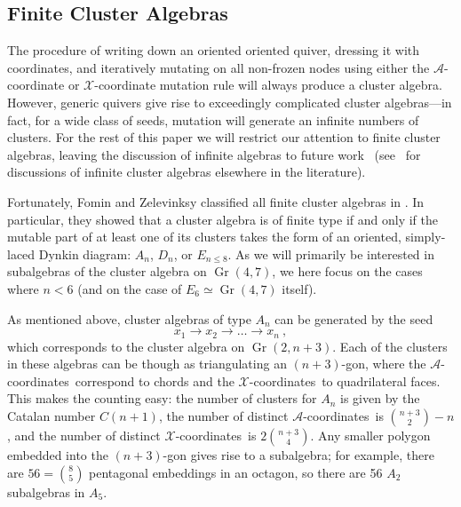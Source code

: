 \documentclass[11pt]{article}
\DeclareMathOperator{\Gr}{Gr}
\def\x{\mathcal{X}}
\def\xcoords{$\mathcal{X}$-coordinates}
\def\a{\mathcal{A}}
\def\acoords{$\mathcal{A}$-coordinates}
\begin{document}


\subsection{Finite Cluster Algebras}\label{sec:finite-algebras}

The procedure of writing down an oriented oriented quiver, dressing it with coordinates, and iteratively mutating on all non-frozen nodes using either the $\a$-coordinate or $\x$-coordinate mutation rule will always produce a cluster algebra. However, generic quivers give rise to exceedingly complicated cluster algebras---in fact, for a wide class of seeds, mutation will generate an infinite numbers of clusters. For the rest of this paper we will restrict our attention to finite cluster algebras, leaving the discussion of infinite algebras to future work~\cite{cluster_subalgebras_ii} (see~\cite{} for discussions of infinite cluster algebras elsewhere in the literature). 


Fortunately, Fomin and Zelevinksy classified all finite cluster algebras in \cite{1054.17024}. In particular, they showed that a cluster algebra is of finite type if and only if the mutable part of at least one of its clusters takes the form of an oriented, simply-laced Dynkin diagram: $A_n$, $D_n$, or $E_{n\le8}$.  As we will primarily be interested in subalgebras of the cluster algebra on $\Gr(4,7)$, we here focus on the cases where $n < 6$ (and on the case of $E_6 \simeq \Gr(4,7)$ itself). 

As mentioned above, cluster algebras of type $A_n$ can be generated by the seed
\begin{equation}\label{def:An}
  x_1\to x_2\to \ldots \to x_n \ ,
\end{equation}
which corresponds to the cluster algebra on $\Gr(2,n{+}3)$. Each of the clusters in these algebras can be though as triangulating an $(n+3)$-gon, where the \acoords\ correspond to chords and the \xcoords\ to quadrilateral faces. This makes the counting easy: the number of clusters for $A_n$ is given by the Catalan number $C(n+1)$, the number of distinct \acoords\ is $\binom{n+3}{2}-n$, and the number of distinct \xcoords\ is $2\binom{n+3}{4}$. Any smaller polygon embedded into the $(n+3)$-gon gives rise to a subalgebra; for example, there are $56=\binom{8}{5}$ pentagonal embeddings in an octagon, so there are 56 $A_2$ subalgebras in $A_5$. 
\end{document}
